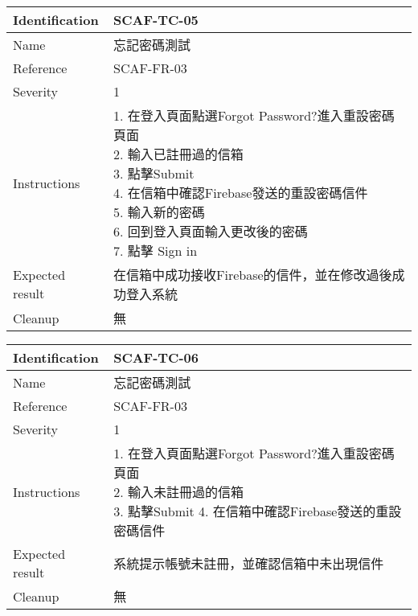 \documentclass{report}
\begin{document}
\begin{tabularx}{0.9\textwidth}{
  |p{}%
  |p{}|%
  }
  \hline
  \centering Identification &  SCAF-TC-05 \\
  \hline
  \centering Name & 忘記密碼測試 \\
  \hline
  \centering Reference & SCAF-FR-03 \\
  \hline
  \centering Severity & 1 \\
  \hline
  \centering Instructions & 
  \makecell{
    1. 在登入頁面點選Forgot Password?進入重設密碼頁面 \\
    2. 輸入已註冊過的信箱  \\
    3. 點擊Submit \\
    4. 在信箱中確認Firebase發送的重設密碼信件 \\
    5. 輸入新的密碼 \\
    6. 回到登入頁面輸入更改後的密碼  \\
    7. 點擊 Sign in
  }\\
  \hline
  \centering Expected result & 在信箱中成功接收Firebase的信件，並在修改過後成功登入系統 \\
  \hline
  \centering Cleanup & 無 \\
  \hline
\end{tabularx}
\newline\newline

\begin{tabularx}{0.9\textwidth}{
  |p{}%
  |p{}|%
  }
  \hline
  \centering Identification &  SCAF-TC-06 \\
  \hline
  \centering Name & 忘記密碼測試 \\
  \hline
  \centering Reference & SCAF-FR-03 \\
  \hline
  \centering Severity & 1 \\
  \hline
  \centering Instructions & 
  \makecell{
    1. 在登入頁面點選Forgot Password?進入重設密碼頁面 \\
    2. 輸入未註冊過的信箱  \\
    3. 點擊Submit
    4. 在信箱中確認Firebase發送的重設密碼信件
  }\\
  \hline
  \centering Expected result & 系統提示帳號未註冊，並確認信箱中未出現信件 \\
  \hline
  \centering Cleanup & 無 \\
  \hline
\end{tabularx}
\newline\newline
\end{document}
